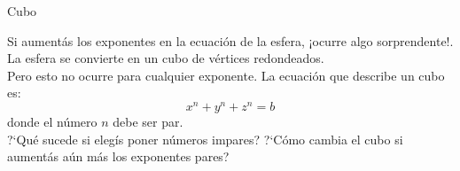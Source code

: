 \documentclass[es]{../../common/SurferDesc}%
\begin{document}
\footnotesize
%

\begin{surferPage}
  \begin{surferTitle}Cubo\end{surferTitle}
   \begin{surferText}
   
Si aument{\'a}s los exponentes en la ecuaci{\'o}n de la esfera, ¡ocurre algo sorprendente!. La esfera se convierte en un cubo de v{\'e}rtices redondeados.\\
\vspace{0.3cm}
Pero esto no ocurre para cualquier exponente. La ecuaci{\'o}n que describe un cubo es:
\[x^n+y^n+z^n=b\]
donde el n{\'u}mero $n$ debe ser par.\\
\vspace{0.3cm}
?`Qu{\'e} sucede si eleg{\'i}s poner n{\'u}meros impares? ?`C{\'o}mo cambia el cubo si aument{\'a}s a{\'u}n m{\'a}s los exponentes pares?
     \end{surferText}
\end{surferPage}
\end{document}
